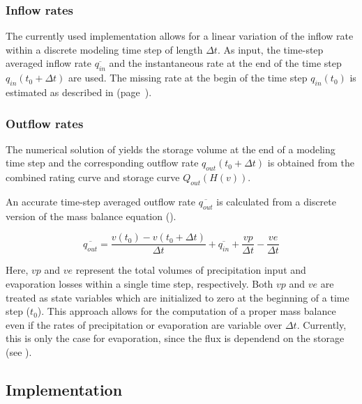 \subsubsection*{Inflow rates}
The currently used implementation allows for a linear variation of the inflow rate within a discrete modeling time step of length $\Delta t$. As input, the time-step averaged inflow rate $\overline{q_{in}}$ and the instantaneous rate at the end of the time step $q_{in}(t_0 + \Delta t)$ are used. The missing rate at the begin of the time step $q_{in}(t_0)$ is estimated as described in  (page~\pageref{sec:chanFlow_singleRes_solution}).

\subsubsection*{Outflow rates}
The numerical solution of  yields the storage volume at the end of a modeling time step and the corresponding outflow rate $q_{out}(t_0 + \Delta t)$ is obtained from the combined rating curve and storage curve $Q_{out}(H(v))$.

An accurate time-step averaged outflow rate $\overline{q_{out}}$ is calculated from a discrete version of the mass balance equation ().

\begin{equation} \label{eqn:resStor_lake_outflowAvg}
  \overline{q_{out}}= \frac{v(t_0) - v(t_0 + \Delta t)}{\Delta t} + \overline{q_{in}} + \frac{vp}{\Delta t} - \frac{ve}{\Delta t}
\end{equation}

Here, $vp$ and $ve$ represent the total volumes of precipitation input and evaporation losses within a single time step, respectively. Both $vp$ and $ve$ are treated as state variables which are initialized to zero at the beginning of a time step ($t_0$). This approach allows for the computation of a proper mass balance even if the rates of precipitation or evaporation are variable over $\Delta t$. Currently, this is only the case for evaporation, since the flux is dependend on the storage (see ).


\subsection{Implementation} \label{sec:resStor_lake_implementation}

